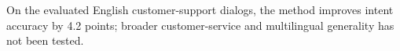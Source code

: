 On the evaluated English customer-support dialogs, the method improves intent accuracy by 4.2 points; broader customer-service and multilingual generality has not been tested.
